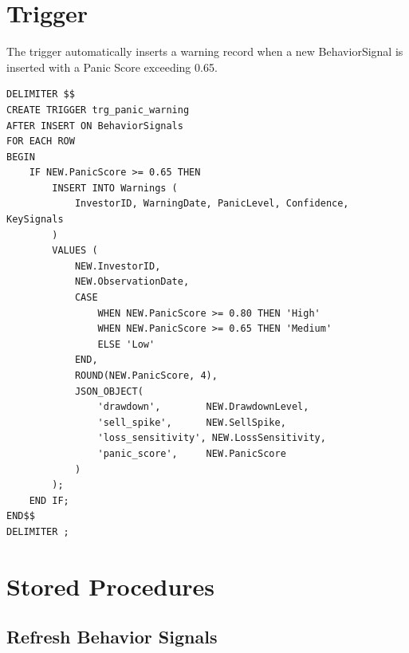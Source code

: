 \section{Trigger}

The trigger automatically inserts a warning record when a new BehaviorSignal is inserted with a Panic Score exceeding 0.65.

\begin{lstlisting}[style=sqlstyle, caption={Trigger: trg\_panic\_warning}]
DELIMITER $$
CREATE TRIGGER trg_panic_warning
AFTER INSERT ON BehaviorSignals
FOR EACH ROW
BEGIN
    IF NEW.PanicScore >= 0.65 THEN
        INSERT INTO Warnings (
            InvestorID, WarningDate, PanicLevel, Confidence, KeySignals
        )
        VALUES (
            NEW.InvestorID,
            NEW.ObservationDate,
            CASE 
                WHEN NEW.PanicScore >= 0.80 THEN 'High'
                WHEN NEW.PanicScore >= 0.65 THEN 'Medium'
                ELSE 'Low'
            END,
            ROUND(NEW.PanicScore, 4),
            JSON_OBJECT(
                'drawdown',        NEW.DrawdownLevel,
                'sell_spike',      NEW.SellSpike,
                'loss_sensitivity', NEW.LossSensitivity,
                'panic_score',     NEW.PanicScore
            )
        );
    END IF;
END$$
DELIMITER ;
\end{lstlisting}

\section{Stored Procedures}

\subsection{Refresh Behavior Signals}

